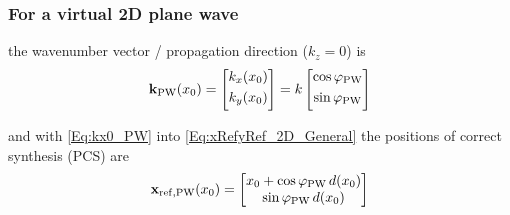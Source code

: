 \subsubsection{For a virtual 2D plane wave} the wavenumber vector / propagation direction ($k_z=0$) is
\begin{equation}
\label{Eq:kx0_PW}
\mathbf{k}_\mathrm{PW}(x_0) = \begin{bmatrix} k_x(x_0) \\[0.3em] k_y(x_0)\\[0.3em]    \end{bmatrix} =  k\begin{bmatrix} \cos\varphi_\text{PW} \\[0.3em] \sin\varphi_\text{PW} \\[0.3em]    \end{bmatrix}
\end{equation}

and with \eqref{Eq:kx0_PW} into \eqref{Eq:xRefyRef_2D_General} the positions of correct synthesis (PCS) are 
\begin{align}
\label{Eq:PCS_PW}
\mathbf{x}_{\mathrm{ref,PW}}(x_0)=
\begin{bmatrix}
x_0 + \cos\varphi_\text{PW} \, d(x_0)\\
\sin\varphi_\text{PW} \, d(x_0)
\end{bmatrix}
\end{align}

